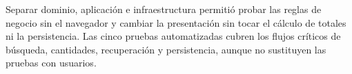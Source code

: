 Separar dominio, aplicación e infraestructura permitió probar las reglas de negocio sin el navegador y cambiar la presentación sin tocar el cálculo de totales ni la persistencia. Las cinco pruebas automatizadas cubren los flujos críticos de búsqueda, cantidades, recuperación y persistencia, aunque no sustituyen las pruebas con usuarios.
